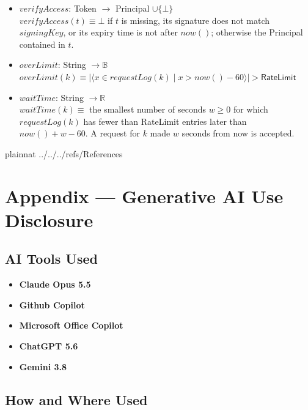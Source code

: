 \documentclass[12pt, titlepage]{article}
\begin{document}
\begin{itemize}
  $\mathit{issueAccess}(s) \equiv$ a token containing $s.\mathit{user}$,
  $\mathit{account}(s.\mathit{user}).\mathit{role}$, $s.\mathit{id}$,
  $s.\mathit{device}$ and the expiry time $\mathit{now}() +
  \textsf{AccessExpiry}$, signed with $\mathit{signingKey}$.
\item $\mathit{verifyAccess}$: Token $\rightarrow$ Principal $\cup \{\bot\}$\\
  $\mathit{verifyAccess}(t) \equiv \bot$ if $t$ is missing, its signature does
  not match $\mathit{signingKey}$, or its expiry time is not after
  $\mathit{now}()$; otherwise the Principal contained in $t$.
\item $\mathit{overLimit}$: String $\rightarrow \mathbb{B}$\\
  $\mathit{overLimit}(k) \equiv |\langle x \in \mathit{requestLog}(k) \mid x >
  \mathit{now}() - 60 \rangle| > \textsf{RateLimit}$
\item $\mathit{waitTime}$: String $\rightarrow \mathbb{R}$\\
  $\mathit{waitTime}(k) \equiv$ the smallest number of seconds $w \geq 0$ for
  which $\mathit{requestLog}(k)$ has fewer than \textsf{RateLimit} entries
  later than $\mathit{now}() + w - 60$. A request for $k$ made $w$ seconds
  from now is accepted.
\end{itemize}

 {plainnat}
 {../../../refs/References}

\newpage
\section{Appendix --- Generative AI Use Disclosure}

\subsection{AI Tools Used}

\begin{itemize}
    \item \textbf{Claude Opus 5.5}
    \item \textbf{Github Copilot}
    \item \textbf{Microsoft Office Copilot}
    \item \textbf{ChatGPT 5.6}
    \item \textbf{Gemini 3.8}
\end{itemize}

\subsection{How and Where Used}
\end{document}

